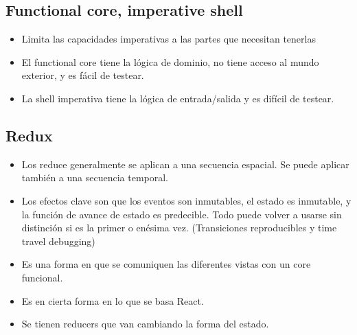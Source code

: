 \subsection*{Functional core, imperative shell}
\begin{itemize}
\item Limita las capacidades imperativas a las partes que necesitan tenerlas
\item El functional core tiene la lógica de dominio, no tiene acceso al mundo exterior, y es fácil de testear.
\item La shell imperativa tiene la lógica de entrada/salida y es difícil de testear.
\end{itemize}


\subsection*{Redux}
\begin{itemize}
\item Los reduce generalmente se aplican a una secuencia espacial. Se puede aplicar también a una secuencia temporal.
\item Los efectos clave son que los eventos son inmutables, el estado es inmutable, y la función de avance de estado es predecible. Todo puede volver a usarse sin distinción si es la primer o enésima vez. (Transiciones reproducibles y time travel debugging)
\item Es una forma en que se comuniquen las diferentes vistas con un core funcional.
\item Es en cierta forma en lo que se basa React.
\item Se tienen reducers que van cambiando la forma del estado.
\end{itemize}





